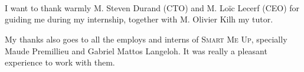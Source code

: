 \documentclass[a4paper,11pt]{custom}
\newcommand{\smu}{\textsc{Smart Me Up}}
\begin{document}
~
\thispagestyle{empty}

%
\headerleftcontent{\headerlefttext}%
\headerrightcontent{\headerrighttext}%
\myfootrulebegin[-.5cm]
\myfootruleend

~

\clearpage


~

\vspace{\fill}
\begin{flushright}
\begin{minipage}[b]{7cm}
I want to thank warmly M. Steven Durand (CTO) and M. Loïc Lecerf (CEO) for
guiding me during my internship, together with M. Olivier Kilh my tutor.

\vspace{0.5em}

My thanks also goes to all the employs and interns of \smu, specially Maude
Premillieu and Gabriel Mattos Langeloh. It was really a pleasant experience to
work with them.
\end{minipage}
\end{flushright}
\vspace{\fill}
\vspace{\fill}


\newpage
~
\newpage

%
%
%
%
%
%
%
%
%


\end{document}
